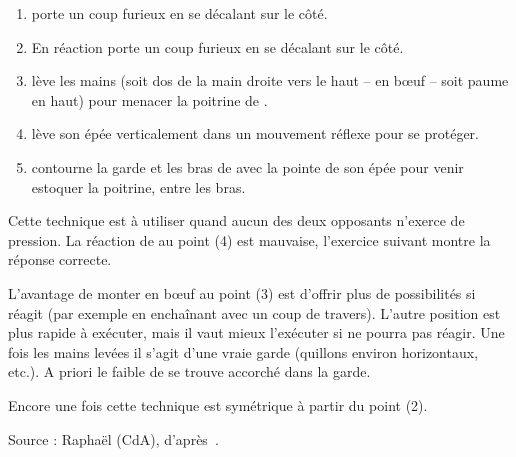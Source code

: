 \begin{exercice}

\begin{enumerate}
	\item \A porte un coup furieux en se décalant sur le côté.
	
	\item En réaction \D porte un coup furieux en se décalant sur le côté.
	
	\item \D lève les mains (soit dos de la main droite vers le haut – en bœuf – soit paume en haut) pour menacer la poitrine de \A.
	
	\item \A lève son épée verticalement dans un mouvement réflexe pour se protéger.
	
	\item \D contourne la garde et les bras de \A avec la pointe de son épée pour venir estoquer la poitrine, entre les bras.
\end{enumerate}

Cette technique est à utiliser quand aucun des deux opposants n'exerce de pression.
La réaction de \A au point (4) est mauvaise, l'exercice suivant montre la réponse correcte.

L'avantage de monter en bœuf au point (3) est d'offrir plus de possibilités si \A réagit (par exemple en enchaînant avec un coup de travers).
L'autre position est plus rapide à exécuter, mais il vaut mieux l'exécuter si \A ne pourra pas réagir.
Une fois les mains levées il s'agit d'une vraie garde (quillons environ horizontaux, etc.).
A priori le faible de \A se trouve accorché dans la garde.

Encore une fois cette technique est symétrique à partir du point (2).

Source : Raphaël (CdA), d'après~\cite[fol.~19r-20v, §3–4, pp.~16–17]{farrell:ringeck}.
\end{exercice}


